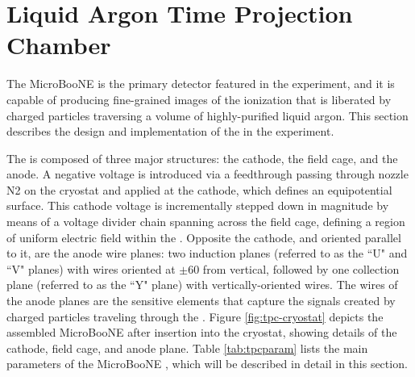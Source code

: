 \section{Liquid Argon Time Projection Chamber}
\label{sec:tpc-all}

The MicroBooNE \lartpc is the primary detector featured in the experiment, and it is capable of producing fine-grained images of the ionization that is liberated by charged particles traversing a volume of highly-purified liquid argon.  This section describes the design and implementation of the \lartpc in the experiment.

The \lartpc is composed of three major structures: the cathode, the field cage, and the anode. A negative voltage is introduced via a feedthrough passing through nozzle N2 on the cryostat and applied at the cathode, which defines an equipotential surface.  This cathode voltage is incrementally stepped down in magnitude by means of a voltage divider chain spanning across the field cage, defining a region of uniform electric field within the \lartpc. Opposite the cathode, and oriented parallel to it, are the anode wire planes: two induction planes (referred to as the ``U" and ``V" planes) with wires oriented at $\pm60$ from vertical, followed by one collection plane (referred to as the ``Y" plane) with vertically-oriented wires.   The wires of the anode planes are the sensitive elements that capture the signals created by charged particles traveling through the \lartpc.  Figure \ref{fig:tpc-cryostat} depicts the assembled MicroBooNE \lartpc after insertion into the cryostat, showing details of the cathode, field cage, and anode plane.  Table \ref{tab:tpcparam} lists the main parameters of the MicroBooNE \lartpc, which will be described in detail in this section.  


